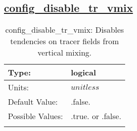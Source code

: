 \subsection[config\_disable\_tr\_vmix]{\hyperref[sec:nm_tab_debug]{config\_disable\_tr\_vmix}}
\label{subsec:nm_sec_config_disable_tr_vmix}
\begin{center}
\begin{longtable}{| p{2.0in} | p{4.0in} |}
    \hline
    Type: & logical \\
    \hline
    Units: & $unitless$ \\
    \hline
    Default Value: & .false. \\
    \hline
    Possible Values: & .true. or .false. \\
    \hline
    \caption{config\_disable\_tr\_vmix: Disables tendencies on tracer fields from vertical mixing.}
\end{longtable}
\end{center}
